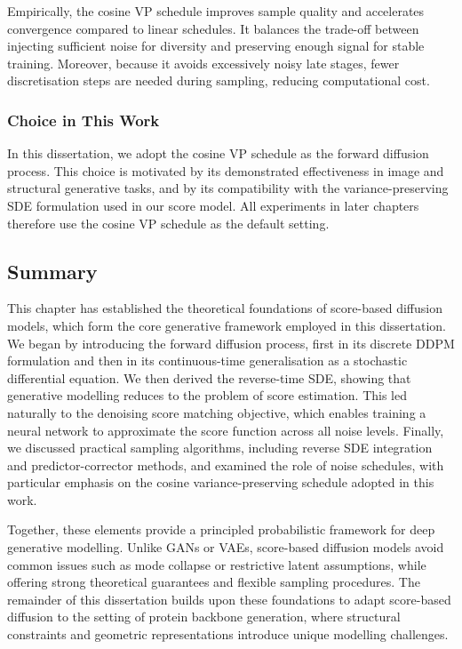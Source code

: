 \documentclass[a4paper,12pt]{article}
\begin{document}
Empirically, the cosine VP schedule improves sample quality and accelerates convergence compared to linear schedules. It balances the trade-off between injecting sufficient noise for diversity and preserving enough signal for stable training. Moreover, because it avoids excessively noisy late stages, fewer discretisation steps are needed during sampling, reducing computational cost.

\subsubsection*{Choice in This Work}
In this dissertation, we adopt the cosine VP schedule as the forward diffusion process. This choice is motivated by its demonstrated effectiveness in image and structural generative tasks, and by its compatibility with the variance-preserving SDE formulation used in our score model. All experiments in later chapters therefore use the cosine VP schedule as the default setting.

\subsection{Summary}
This chapter has established the theoretical foundations of score-based diffusion models, which form the core generative framework employed in this dissertation. We began by introducing the forward diffusion process, first in its discrete DDPM formulation and then in its continuous-time generalisation as a stochastic differential equation. We then derived the reverse-time SDE, showing that generative modelling reduces to the problem of score estimation. This led naturally to the denoising score matching objective, which enables training a neural network to approximate the score function across all noise levels. Finally, we discussed practical sampling algorithms, including reverse SDE integration and predictor-corrector methods, and examined the role of noise schedules, with particular emphasis on the cosine variance-preserving schedule adopted in this work.

Together, these elements provide a principled probabilistic framework for deep generative modelling. Unlike GANs or VAEs, score-based diffusion models avoid common issues such as mode collapse or restrictive latent assumptions, while offering strong theoretical guarantees and flexible sampling procedures. The remainder of this dissertation builds upon these foundations to adapt score-based diffusion to the setting of protein backbone generation, where structural constraints and geometric representations introduce unique modelling challenges.
\end{document}
